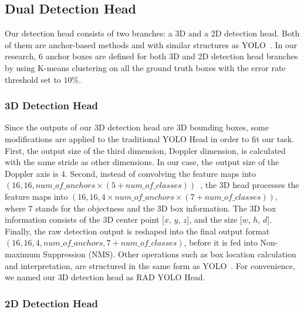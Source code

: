 \documentclass[10pt, conference, compsocconf]{IEEEtran}
\begin{document}
\subsection{Dual Detection Head}

Our detection head consists of two branches: a 3D and a 2D detection head. Both of them are anchor-based methods and with similar structures as YOLO~\cite{Ref:YOLOv4}. In our research, $6$ anchor boxes are defined for both 3D and 2D detection head branches
by 
using K-means clustering on all the ground truth boxes with the error rate threshold set to $10\%$. 


\subsubsection{3D Detection Head}

Since the outputs of our 3D detection head are 3D bounding boxes, some modifications are applied to the traditional YOLO Head in order to fit our task. First, the 
output size of the third 
dimension, Doppler dimension, is calculated with the same 
stride as other dimensions. In our case, the output size of the Doppler axis is $4$. Second, instead of convolving the feature maps into $(16, 16, num\_of\_anchors \times (5 + num\_of\_classes))$~\cite{Ref:YOLOv4}, the 3D head processes the feature maps into $(16, 16, 4 \times num\_of\_anchors \times (7 + num\_of\_classes))$, where $7$ stands for the objectness and the 3D box information. The 3D box information consists of the 3D center point [$x$, $y$, $z$], and the size [$w$, $h$, $d$]. Finally, the raw detection output is reshaped into the final output format $(16, 16, 4, num\_of\_anchors, 7 + num\_of\_classes)$, before it is fed into Non-maximum Suppression (NMS). Other operations such as box location calculation and interpretation, are structured in the same form as YOLO~\cite{Ref:YOLOv4}. For convenience, we named our 3D detection head as RAD YOLO Head.

\subsubsection{2D Detection Head}
\end{document}
